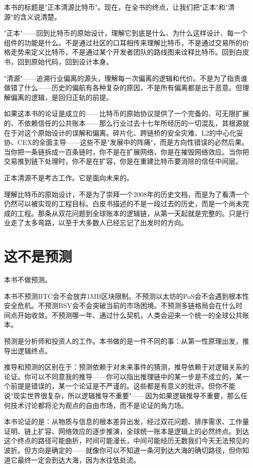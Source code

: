 \documentclass[a4paper,12pt,openany]{ctexbook}
\begin{document}
本书的标题是"正本清源比特币"。现在，在全书的终点，让我们把"正本"和"清源"的含义说清楚。

"正本"——回到比特币的原始设计，理解它到底是什么、为什么这样设计、每一个组件的功能是什么。不是通过社区的口耳相传来理解比特币，不是通过交易所的价格走势来定义比特币，不是通过某个开发者团队的路线图来诠释比特币。回到白皮书，回到原始代码，回到设计本身。

"清源"——追溯行业偏离的源头，理解每一次偏离的逻辑和代价。不是为了指责谁做错了什么——历史的偏航有各种复杂的原因，不是所有偏离都是出于恶意。但理解偏离的逻辑，是回归正轨的前提。

如果这本书的论证是成立的——比特币的原始协议提供了一个完备的、可无限扩展的、不依赖信任的公共账本——那么行业过去十七年所经历的一切混乱，其根源就在于对这个原始设计的误解和偏离。碎片化、跨链桥的安全灾难、L2的中心化妥协、CEX的全面主导——这些不是"发展中的阵痛"，而是方向性错误的必然后果。当你把一条链拆成一百条链时，你不是在扩展网络，你是在摧毁网络效应。当你把交易推到链下处理时，你不是在扩容，你是在重建比特币要消除的信任中间层。

正本清源不是考古工作。它是面向未来的。

理解比特币的原始设计，不是为了崇拜一个2008年的历史文档，而是为了看清一个仍然可以被实现的工程目标。白皮书描述的不是一段过去的历史，而是一个尚未完成的工程。那条从双花问题到全球账本的逻辑链，从第一天起就是完整的。只是行业走了太多弯路，以至于大多数人已经忘记了出发时的方向。


\section*{这不是预测}


本书不做预测。

本书不预测BTC会不会放弃1MB区块限制。不预测以太坊的PoS会不会遇到根本性安全危机。不预测BSV会不会突破当前的市场困境。不预测多链格局会在什么时间点开始收敛。不预测哪一年、通过什么契机，人类会迎来一个统一的全球公共账本。

预测是分析师和投资人的工作。本书做的是一件不同的事：从第一性原理出发，推导出逻辑终点。

推导和预测的区别在于：预测依赖于对未来事件的猜测，推导依赖于对逻辑关系的论证。你可以不同意我的推导——你可以指出推理链中的某一步是不成立的，某一个前提是错误的，某一个论证是不严谨的。这些都是有意义的批评。但你不能说"现实世界很复杂，所以逻辑推导不重要"——因为如果逻辑推导不重要，那么任何技术讨论都将沦为观点的自由市场，而不是论证的角力场。

本书论证的是：从物质与信息的根本差异出发，经过双花问题、排序需求、工作量证明、链上扩容、网络效应的逐步推演，全球统一账本是逻辑上的必然终点。到达这个终点的路径可能曲折，时间可能漫长，中间可能经历无数我们今天无法预见的波折。但方向是确定的——就像你可以不知道一条河到达大海的确切路径，但你知道它最终一定会到达大海，因为水往低处流。
\end{document}
